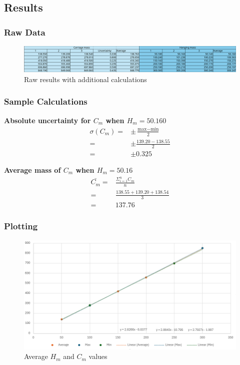 \documentclass[11pt,a4paper]{article}
\begin{document}
\subsection{Results}

\subsubsection{Raw Data}
\begin{center}
	\centering
	\begin{figure}[h]
		\centering
		\includegraphics[width=0.84\paperwidth]{resultstable.png}
		\caption{Raw results with additional calculations}
	\end{figure}
	
\end{center}


\subsubsection{Sample Calculations}
\begin{center}
\textbf{Absolute uncertainty for $C_m$ when $H_m=50.160$}
\begin{align*}
	\sigma(C_m)=&\pm\frac{\textrm{max}-\textrm{min}}{2}\\
	=&\pm\frac{139.20-138.55}{2}
	\\=&\pm0.325
\end{align*}
\newline


\textbf{Average mass of $C_m$ when $H_m=50.16$}
\begin{align*}
		\bar{C_m}=&\frac{\Sigma^n_{i=1}C_m}{n}\\
		=&\frac{138.55+139.20+138.54}{3}\\
		=&137.76
	\end{align*}
\end{center}

\subsubsection{Plotting}

\begin{figure}[H]
\centering
\includegraphics[width=0.8\paperwidth]{newresults.png}
\caption{Average $H_m$ and $C_m$ values}
\end{figure}
\end{document}
